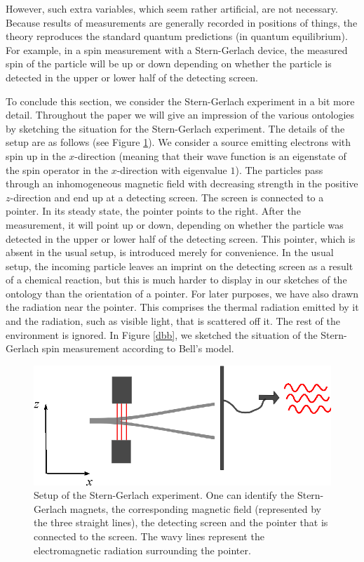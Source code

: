 \documentclass[12pt]{article}
\begin{document}
However, such extra variables, which seem rather artificial, are not necessary. Because results of measurements are generally recorded in positions of things, the theory reproduces the standard quantum predictions (in quantum equilibrium). For example, in a spin measurement with a Stern-Gerlach device, the measured spin of the particle will be up or down depending on whether the particle is detected in the upper or lower half of the detecting screen.

To conclude this section, we consider the Stern-Gerlach experiment in a bit more detail. Throughout the paper we will give an impression of the various ontologies by sketching the situation for the Stern-Gerlach experiment. The details of the setup are as follows (see Figure \ref{sterngerlach}). We consider a source emitting electrons with spin up in the $x$-direction (meaning that their wave function is an eigenstate of the spin operator in the $x$-direction with eigenvalue $1$). The particles pass through an inhomogeneous magnetic field with decreasing strength in the positive $z$-direction and end up at a detecting screen. The screen is connected to a pointer. In its steady state, the pointer points to the right. After the measurement, it will point up or down, depending on whether the particle was detected in the upper or lower half of the detecting screen. This pointer, which is absent in the usual setup, is introduced merely for convenience. In the usual setup, the incoming particle leaves an imprint on the detecting screen as a result of a chemical reaction, but this is much harder to display in our sketches of the ontology than the orientation of a pointer. For later purposes, we have also drawn the radiation near the pointer. This comprises the thermal radiation emitted by it and the radiation, such as visible light, that is scattered off it. The rest of the environment is ignored. In Figure \ref{dbb}, we sketched the situation of the Stern-Gerlach spin measurement according to Bell's model.

 
\begin{figure}
\begin{center}
\includegraphics{sterngerlach.eps}
\end{center}
\caption{\label{sterngerlach}Setup of the Stern-Gerlach experiment. One can identify the Stern-Gerlach magnets, the corresponding magnetic field (represented by the three straight lines), the detecting screen and the pointer that is connected to the screen. The wavy lines represent the electromagnetic radiation surrounding the pointer.}
\end{figure} 
\end{document}
